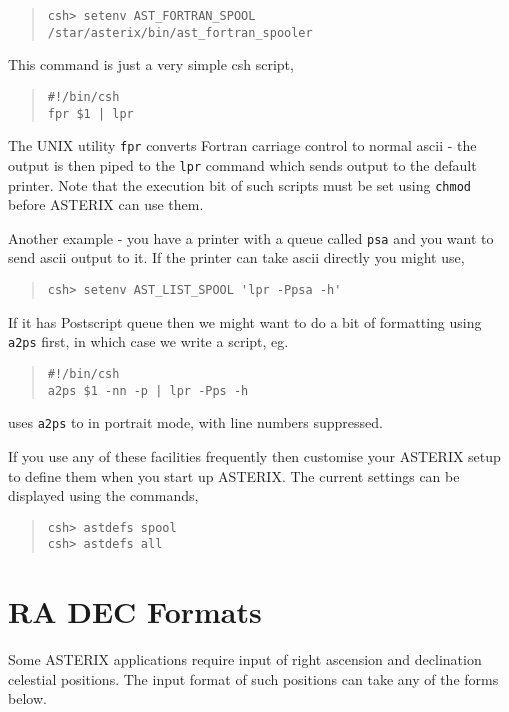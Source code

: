 \documentclass{book}
\renewcommand{\_}{{\tt\char'137}}     %
\begin{document}
\begin{quote}\begin{verbatim}
csh> setenv AST_FORTRAN_SPOOL /star/asterix/bin/ast_fortran_spooler
\end{verbatim}\end{quote}
This command is just a very simple csh script,

\begin{quote}\begin{verbatim}
#!/bin/csh
fpr $1 | lpr
\end{verbatim}\end{quote}
The UNIX utility {\tt fpr} converts Fortran carriage control to normal
ascii - the output is then piped to the {\tt lpr} command which sends
output to the default printer. Note that the execution bit of such
scripts must be set using {\tt chmod} before ASTERIX can use them.

Another example - you have a printer with a queue
called {\tt psa} and you want to send ascii output to it. If the printer
can take ascii directly you might use,

\begin{quote}\begin{verbatim}
csh> setenv AST_LIST_SPOOL 'lpr -Ppsa -h'
\end{verbatim}\end{quote}
If it has Postscript queue then we might want to do a bit of
formatting using {\tt a2ps} first, in which case we write a script, eg.

\begin{quote}\begin{verbatim}
#!/bin/csh
a2ps $1 -nn -p | lpr -Pps -h
\end{verbatim}\end{quote}
uses {\tt a2ps} to in portrait mode, with line numbers suppressed.

If you use any of these facilities frequently then customise
your ASTERIX setup to define them when you start up ASTERIX. The
current settings can be displayed using the commands,

\begin{quote}\begin{verbatim}
csh> astdefs spool
csh> astdefs all
\end{verbatim}\end{quote}
\section{RA DEC Formats}
Some ASTERIX applications require input of right ascension and
declination celestial positions. The input format of such positions
can take any of the forms below.
\end{document}
